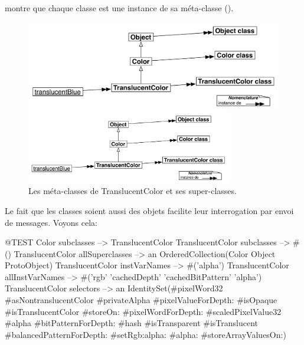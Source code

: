 \documentclass[a4paper,10pt,twoside]{book}
\begin{document}
\noindent
{} montre que chaque classe est une instance de sa méta-classe ().

\begin{center}
\begin{figure}[!ht]
\ifluluelse
	{\centerline {\includegraphics[width=\textwidth]{TranslucentMetaclasses}}}
	{\centerline {\includegraphics[width=0.8\textwidth]{TranslucentMetaclasses}}}
\caption{Les méta-classes de TranslucentColor et ses super-classes.}
\end{figure}
\end{center}


Le fait que les classes soient aussi des objets facilite leur interrogation par envoi de messages.
Voyons cela:
\begin{code}{@TEST}
Color subclasses                           --> {TranslucentColor}
TranslucentColor subclasses         --> #()
TranslucentColor allSuperclasses  --> an OrderedCollection(Color Object ProtoObject)
TranslucentColor instVarNames     --> #('alpha')
TranslucentColor allInstVarNames --> #('rgb' 'cachedDepth' 'cachedBitPattern' 'alpha')
TranslucentColor selectors             -->  an IdentitySet(#pixelWord32 #asNontranslucentColor #privateAlpha #pixelValueForDepth: #isOpaque #isTranslucentColor #storeOn: #pixelWordForDepth: #scaledPixelValue32 #alpha #bitPatternForDepth: #hash #isTransparent #isTranslucent #balancedPatternForDepth: #setRgb:alpha: #alpha: #storeArrayValuesOn:)
\end{code}
\end{document}
